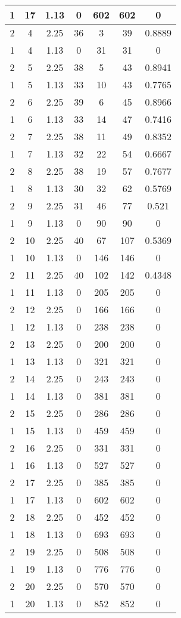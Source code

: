 \documentclass[letterpaper, 12pt]{article}
\begin{document}
\begin{longtable}{|c|c|c|c|c|c|c|}
1 & 17 & 1.13 & 0 & 602 & 602 & 0 \\
\hline
2 & 4 & 2.25 & 36 & 3 & 39 & 0.8889 \\
\hline
1 & 4 & 1.13 & 0 & 31 & 31 & 0 \\
\hline
2 & 5 & 2.25 & 38 & 5 & 43 & 0.8941 \\
\hline
1 & 5 & 1.13 & 33 & 10 & 43 & 0.7765 \\
\hline
2 & 6 & 2.25 & 39 & 6 & 45 & 0.8966 \\
\hline
1 & 6 & 1.13 & 33 & 14 & 47 & 0.7416 \\
\hline
2 & 7 & 2.25 & 38 & 11 & 49 & 0.8352 \\
\hline
1 & 7 & 1.13 & 32 & 22 & 54 & 0.6667 \\
\hline
2 & 8 & 2.25 & 38 & 19 & 57 & 0.7677 \\
\hline
1 & 8 & 1.13 & 30 & 32 & 62 & 0.5769 \\
\hline
2 & 9 & 2.25 & 31 & 46 & 77 & 0.521 \\
\hline
1 & 9 & 1.13 & 0 & 90 & 90 & 0 \\
\hline
2 & 10 & 2.25 & 40 & 67 & 107 & 0.5369 \\
\hline
1 & 10 & 1.13 & 0 & 146 & 146 & 0 \\
\hline
2 & 11 & 2.25 & 40 & 102 & 142 & 0.4348 \\
\hline
1 & 11 & 1.13 & 0 & 205 & 205 & 0 \\
\hline
2 & 12 & 2.25 & 0 & 166 & 166 & 0 \\
\hline
1 & 12 & 1.13 & 0 & 238 & 238 & 0 \\
\hline
2 & 13 & 2.25 & 0 & 200 & 200 & 0 \\
\hline
1 & 13 & 1.13 & 0 & 321 & 321 & 0 \\
\hline
2 & 14 & 2.25 & 0 & 243 & 243 & 0 \\
\hline
1 & 14 & 1.13 & 0 & 381 & 381 & 0 \\
\hline
2 & 15 & 2.25 & 0 & 286 & 286 & 0 \\
\hline
1 & 15 & 1.13 & 0 & 459 & 459 & 0 \\
\hline
2 & 16 & 2.25 & 0 & 331 & 331 & 0 \\
\hline
1 & 16 & 1.13 & 0 & 527 & 527 & 0 \\
\hline
2 & 17 & 2.25 & 0 & 385 & 385 & 0 \\
\hline
1 & 17 & 1.13 & 0 & 602 & 602 & 0 \\
\hline
2 & 18 & 2.25 & 0 & 452 & 452 & 0 \\
\hline
1 & 18 & 1.13 & 0 & 693 & 693 & 0 \\
\hline
2 & 19 & 2.25 & 0 & 508 & 508 & 0 \\
\hline
1 & 19 & 1.13 & 0 & 776 & 776 & 0 \\
\hline
2 & 20 & 2.25 & 0 & 570 & 570 & 0 \\
\hline
1 & 20 & 1.13 & 0 & 852 & 852 & 0 \\
\hline
\end{longtable}
\end{document}
